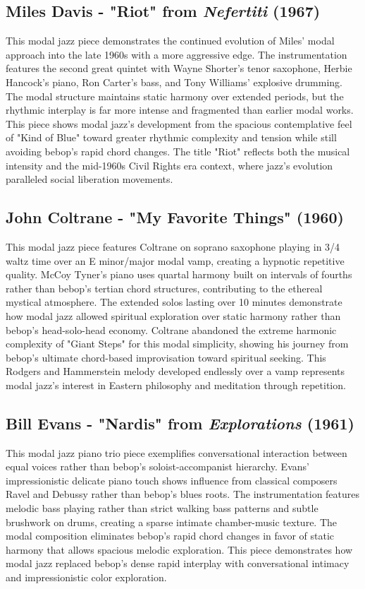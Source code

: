 \documentclass[11pt]{article}
\begin{document}
\subsection*{Miles Davis - "Riot" from \emph{Nefertiti} (1967)}
This modal jazz piece demonstrates the continued evolution of Miles' modal approach into the late 1960s with a more aggressive edge. The instrumentation features the second great quintet with Wayne Shorter's tenor saxophone, Herbie Hancock's piano, Ron Carter's bass, and Tony Williams' explosive drumming. The modal structure maintains static harmony over extended periods, but the rhythmic interplay is far more intense and fragmented than earlier modal works. This piece shows modal jazz's development from the spacious contemplative feel of "Kind of Blue" toward greater rhythmic complexity and tension while still avoiding bebop's rapid chord changes. The title "Riot" reflects both the musical intensity and the mid-1960s Civil Rights era context, where jazz's evolution paralleled social liberation movements.

\subsection*{John Coltrane - "My Favorite Things" (1960)}
This modal jazz piece features Coltrane on soprano saxophone playing in 3/4 waltz time over an E minor/major modal vamp, creating a hypnotic repetitive quality. McCoy Tyner's piano uses quartal harmony built on intervals of fourths rather than bebop's tertian chord structures, contributing to the ethereal mystical atmosphere. The extended solos lasting over 10 minutes demonstrate how modal jazz allowed spiritual exploration over static harmony rather than bebop's head-solo-head economy. Coltrane abandoned the extreme harmonic complexity of "Giant Steps" for this modal simplicity, showing his journey from bebop's ultimate chord-based improvisation toward spiritual seeking. This Rodgers and Hammerstein melody developed endlessly over a vamp represents modal jazz's interest in Eastern philosophy and meditation through repetition.

\subsection*{Bill Evans - "Nardis" from \emph{Explorations} (1961)}
This modal jazz piano trio piece exemplifies conversational interaction between equal voices rather than bebop's soloist-accompanist hierarchy. Evans' impressionistic delicate piano touch shows influence from classical composers Ravel and Debussy rather than bebop's blues roots. The instrumentation features melodic bass playing rather than strict walking bass patterns and subtle brushwork on drums, creating a sparse intimate chamber-music texture. The modal composition eliminates bebop's rapid chord changes in favor of static harmony that allows spacious melodic exploration. This piece demonstrates how modal jazz replaced bebop's dense rapid interplay with conversational intimacy and impressionistic color exploration.
\end{document}
